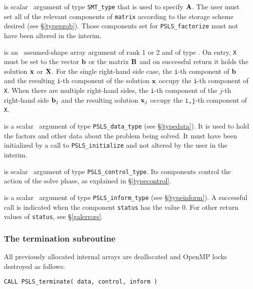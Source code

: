 \documentclass{galahad}
\newcommand{\packagename}{PSLS}
\begin{document}
\begin{description}

 is scalar \intentin\ argument of type {\tt SMT\_type}
that is used to specify ${\mathbf{A}}$.
The user must set all of the relevant components of {\tt matrix} according
to the storage scheme desired (see \S\ref{typeprob}). Those components
set for {\tt \packagename\_factorize} must not have been altered in the interim.

 is an \intentinout\ assumed-shape array argument of rank 1 or 2
and of type \realdp.  On entry, {\tt X} must be set
to the vector ${\mathbf{b}}$ or the matrix ${\mathbf{B}}$ and on successful return it holds
the solution ${\mathbf{x}}$ or ${\mathbf{X}}$. For the single right-hand side case, the
{\tt i}-th component of ${\mathbf{b}}$ and the resulting
{\tt i}-th component of the solution ${\mathbf{x}}$
occupy the {\tt i}-th component of {\tt X}. When there are multiple
right-hand sides, the
{\tt i}-th component of the $j$-th right-hand side ${\mathbf{b}}_j$
and the resulting solution ${\mathbf{x}}_j$ occupy the
{\tt i,j}-th component of {\tt X}.

 is a scalar \intentinout\ argument of type
{\tt \packagename\_data\_type}
(see \S\ref{typedata}). It is used to hold the factors and other
data about the problem being solved.
It must have been initialized by a call to
{\tt \packagename\_ini\-tialize} and not altered by the user in the interim.

 is scalar \intentin\ argument of type
{\tt \packagename\_control\_type}. Its components control the action
of the solve phase, as explained in
\S\ref{typecontrol}.

 is a scalar \intentinout\ argument of type
{\tt \packagename\_inform\_type}
(see \S\ref{typeinform}).
A successful call is indicated when the  component {\tt status} has the value 0.
For other return values of {\tt status}, see \S\ref{galerrors}.

\end{description}


\subsubsection{The termination subroutine}
All previously allocated internal arrays are deallocated and OpenMP locks
destroyed as follows:

\hskip0.5in
{\tt CALL \packagename\_terminate( data, control, inform )}
\end{document}
